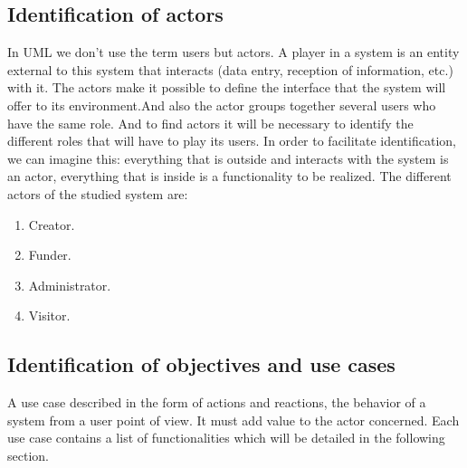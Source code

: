 \subsection{Identification of actors}
In UML we don't use the term users but actors. A player in a system is an entity external to this system that interacts (data entry, reception of information, etc.) with it. The actors make it possible to define the interface that the system will offer to its environment.And also the actor groups together several users who have the same role. And to find actors it will be necessary to identify the different roles that will have to play its users.
In order to facilitate identification, we can imagine this: everything that is outside and interacts with the system is an actor, everything that is inside is a functionality to be realized.
The different actors of the studied system are:

\begin{enumerate}
    \item  Creator.
    \item  Funder.
    \item  Administrator.
    \item  Visitor.

\end{enumerate}

\subsection{Identification of objectives and use cases}
A use case described in the form of actions and reactions, the behavior of a system from a user point of view. It must add value to the actor concerned. Each use case contains a list of functionalities which will be detailed in the following section.

